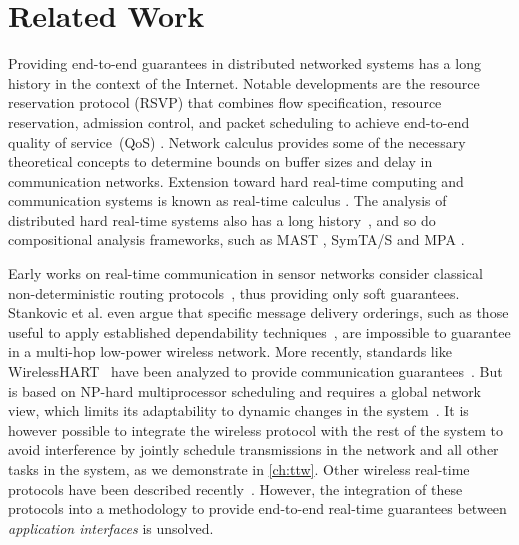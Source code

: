 
\section{Related Work}
\label{sec:relWork}

Providing end-to-end guarantees in distributed networked systems has a long history in the context of the Internet. Notable developments are the resource reservation protocol (RSVP) that combines flow specification, resource reservation, admission control, and packet scheduling to achieve end-to-end quality of service~(QoS) \cite{zhang1993rsvp}. Network calculus \cite{cruz1991calculus} provides some of the necessary theoretical concepts to determine bounds on buffer sizes and delay in communication networks.
Extension toward hard real-time computing and communication systems is known as real-time calculus \cite{thiele2000Realtime}.
The analysis of distributed hard real-time systems also has a long history~\cite{tindell1994Holistic}, and so do compositional analysis frameworks, such as MAST \cite{gonzalezharbour2001MAST}, SymTA/S \cite{henia2005System} and MPA \cite{wandeler2006System}.

Early works on real-time communication in sensor networks consider classical non-deterministic routing protocols~\cite{lu2002RAP,stankovic2003Realtime,he2003SPEED}, thus providing only soft guarantees.
Stankovic et al. \cite{stankovic2003Realtime} even argue that specific message delivery orderings, such as those useful to apply established dependability techniques~\cite{ferrari2013Virtus}, are impossible to guarantee in a multi-hop low-power wireless network.
More recently, standards like WirelessHART~\cite{wirelessHART} have been analyzed to provide communication guarantees~\cite{saifullah2015EndtoEnd,saifullah2010RealTime}.
But~\cite{saifullah2010RealTime} is based on NP-hard multiprocessor scheduling and requires a global network view, which limits its adaptability to dynamic changes in the system~\cite{akerberg2011Measurements}.
It is however possible to integrate the wireless protocol with the rest of the system to avoid interference by jointly schedule transmissions in the network and all other tasks in the system, as we demonstrate in \cref{ch:ttw}.
Other wireless real-time protocols have been described recently~\cite{odonovan2013GINSENG,watteyne2017Teaching}. However, the integration of these protocols into a methodology to provide end-to-end real-time guarantees between \emph{application interfaces} is unsolved.

